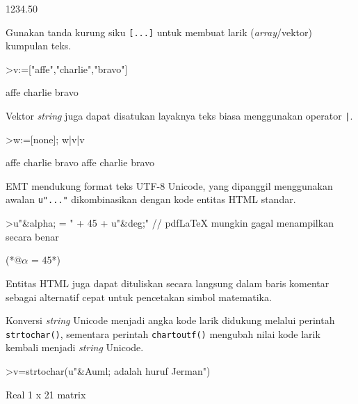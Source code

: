 \documentclass[a4paper,11pt,oneside,enabledeprecatedfontcommands]{scrbook}
\newenvironment{eulernotebook}{}{}
\newenvironment{eulercomment}{\par\medskip\noindent}{\par\medskip}
\begin{document}
\begin{eulernotebook}
\begin{euleroutput}
    1234.50 
\end{euleroutput}
\begin{eulercomment}
Gunakan tanda kurung siku \texttt{[...]} untuk membuat larik (\emph{array}/vektor) kumpulan teks.
\end{eulercomment}
\begin{eulerprompt}
>v:=["affe","charlie","bravo"]
\end{eulerprompt}
\begin{euleroutput}
affe
charlie
bravo
\end{euleroutput}
\begin{eulercomment}
Vektor \emph{string} juga dapat disatukan layaknya teks biasa menggunakan operator \texttt{|}.
\end{eulercomment}
\begin{eulerprompt}
>w:=[none]; w|v|v
\end{eulerprompt}
\begin{euleroutput}
affe
charlie
bravo
affe
charlie
bravo
\end{euleroutput}
\begin{eulercomment}
EMT mendukung format teks UTF-8 Unicode, yang dipanggil menggunakan awalan \texttt{u"..."} dikombinasikan dengan kode entitas HTML standar.
\end{eulercomment}
\begin{eulerprompt}
>u"&alpha; = " + 45 + u"&deg;" // pdfLaTeX mungkin gagal menampilkan secara benar
\end{eulerprompt}
\begin{euleroutput}
(*@$\alpha$ = 45\textdegree@*)
\end{euleroutput}
\begin{eulercomment}
Entitas HTML juga dapat dituliskan secara langsung dalam baris komentar sebagai alternatif cepat untuk pencetakan simbol matematika.

Konversi \emph{string} Unicode menjadi angka kode larik didukung melalui perintah \texttt{strtochar()}, sementara perintah \texttt{chartoutf()} mengubah nilai kode larik kembali menjadi \emph{string} Unicode.
\end{eulercomment}
\begin{eulerprompt}
>v=strtochar(u"&Auml; adalah huruf Jerman")
\end{eulerprompt}
\begin{euleroutput}
Real 1 x 21 matrix


\end{euleroutput}
\end{eulernotebook}
\end{document}
